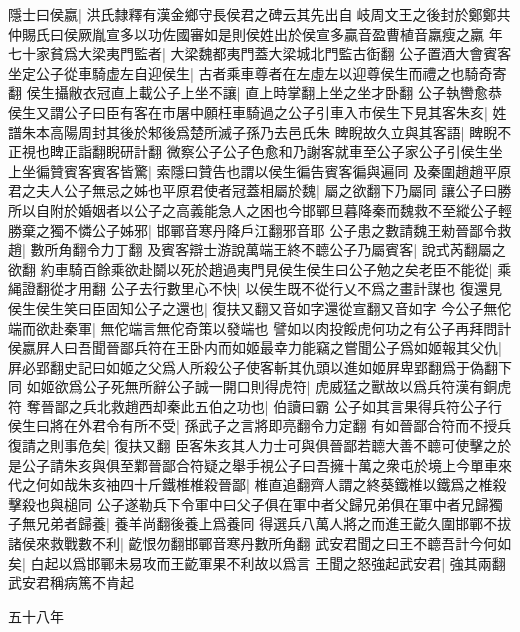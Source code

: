 隱士曰侯嬴|{
	洪氏隸釋有漢金鄉守長侯君之碑云其先出自岐周文王之後封於鄭鄭共仲賜氏曰侯厥胤宣多以功佐國審如是則侯姓出於侯宣多贏音盈曹植音羸瘦之羸}
年七十家貧爲大梁夷門監者|{
	大梁魏都夷門蓋大梁城北門監古衘翻}
公子置酒大會賓客坐定公子從車騎虚左自迎侯生|{
	古者乘車尊者在左虛左以迎尊侯生而禮之也騎奇寄翻}
侯生攝敝衣冠直上載公子上坐不讓|{
	直上時掌翻上坐之坐才卧翻}
公子執轡愈恭侯生又謂公子曰臣有客在市屠中願枉車騎過之公子引車入市侯生下見其客朱亥|{
	姓譜朱本高陽周封其後於邾後爲楚所滅子孫乃去邑氏朱}
睥睨故久立與其客語|{
	睥睨不正視也睥正詣翻睨研計翻}
微察公子公子色愈和乃謝客就車至公子家公子引侯生坐上坐徧贊賓客賓客皆驚|{
	索隱曰贊告也謂以侯生徧告賓客徧與遍同}
及秦圍趙趙平原君之夫人公子無忌之姊也平原君使者冠蓋相屬於魏|{
	屬之欲翻下乃屬同}
讓公子曰勝所以自附於婚姻者以公子之高義能急人之困也今邯鄲旦暮降秦而魏救不至縱公子輕勝棄之獨不憐公子姊邪|{
	邯鄲音寒丹降戶江翻邪音耶}
公子患之數請魏王勑晉鄙令救趙|{
	數所角翻令力丁翻}
及賓客辯士游說萬端王終不聼公子乃屬賓客|{
	說式芮翻屬之欲翻}
約車騎百餘乘欲赴鬬以死於趙過夷門見侯生侯生曰公子勉之矣老臣不能從|{
	乘䋲證翻從才用翻}
公子去行數里心不快|{
	以侯生既不從行乂不爲之畫計謀也}
復還見侯生侯生笑曰臣固知公子之還也|{
	復扶又翻又音如字還從宣翻又音如字}
今公子無佗端而欲赴秦軍|{
	無佗端言無佗奇策以發端也}
譬如以肉投餒虎何功之有公子再拜問計侯嬴屛人曰吾聞晉鄙兵符在王卧内而如姬最幸力能竊之嘗聞公子爲如姬報其父仇|{
	屛必郢翻史記曰如姬之父爲人所殺公子使客斬其仇頭以進如姬屛卑郢翻爲于偽翻下同}
如姬欲爲公子死無所辭公子誠一開口則得虎符|{
	虎威猛之獸故以爲兵符漢有銅虎符}
奪晉鄙之兵北救趙西却秦此五伯之功也|{
	伯讀曰霸}
公子如其言果得兵符公子行侯生曰將在外君令有所不受|{
	孫武子之言將即亮翻令力定翻}
有如晉鄙合符而不授兵復請之則事危矣|{
	復扶又翻}
臣客朱亥其人力士可與俱晉鄙若聼大善不聼可使擊之於是公子請朱亥與俱至鄴晉鄙合符疑之舉手視公子曰吾擁十萬之衆屯於境上今單車來代之何如哉朱亥䄂四十斤鐵椎椎殺晉鄙|{
	椎直追翻齊人謂之終葵鐵椎以鐵爲之椎殺擊殺也與槌同}
公子遂勒兵下令軍中曰父子俱在軍中者父歸兄弟俱在軍中者兄歸獨子無兄弟者歸養|{
	養羊尚翻後養上爲養同}
得選兵八萬人將之而進王齕久圍邯鄲不拔諸侯來救戰數不利|{
	齕恨勿翻邯鄲音寒丹數所角翻}
武安君聞之曰王不聼吾計今何如矣|{
	白起以爲邯鄲未易攻而王齕軍果不利故以爲言}
王聞之怒強起武安君|{
	強其兩翻}
武安君稱病篤不肯起


五十八年


